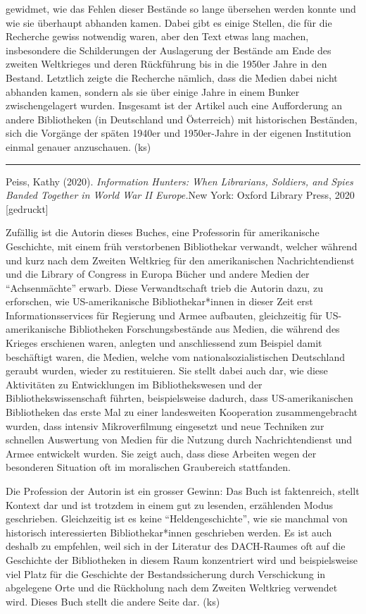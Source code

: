 \documentclass[a4paper,
fontsize=11pt,
oneside,
numbers=noperiodatend,
parskip=half-,
bibliography=totoc,
final
]{scrartcl}
\begin{document}
gewidmet, wie das Fehlen dieser Bestände so lange übersehen werden
konnte und wie sie überhaupt abhanden kamen. Dabei gibt es einige
Stellen, die für die Recherche gewiss notwendig waren, aber den Text
etwas lang machen, insbesondere die Schilderungen der Auslagerung der
Bestände am Ende des zweiten Weltkrieges und deren Rückführung bis in
die 1950er Jahre in den Bestand. Letztlich zeigte die Recherche nämlich,
dass die Medien dabei nicht abhanden kamen, sondern als sie über einige
Jahre in einem Bunker zwischengelagert wurden. Insgesamt ist der Artikel
auch eine Aufforderung an andere Bibliotheken (in Deutschland und
Österreich) mit historischen Beständen, sich die Vorgänge der späten
1940er und 1950er-Jahre in der eigenen Institution einmal genauer
anzuschauen. (ks)

\begin{center}\rule{0.5\linewidth}{0.5pt}\end{center}

Peiss, Kathy (2020). \emph{Information Hunters: When Librarians,
Soldiers, and Spies Banded Together in World War II Europe.}New York:
Oxford Library Press, 2020 {[}gedruckt{]}

Zufällig ist die Autorin dieses Buches, eine Professorin für
amerikanische Geschichte, mit einem früh verstorbenen Bibliothekar
verwandt, welcher während und kurz nach dem Zweiten Weltkrieg für den
amerikanischen Nachrichtendienst und die Library of Congress in Europa
Bücher und andere Medien der \enquote{Achsenmächte} erwarb. Diese
Verwandtschaft trieb die Autorin dazu, zu erforschen, wie
US-amerikanische Bibliothekar*innen in dieser Zeit erst
Informationsservices für Regierung und Armee aufbauten, gleichzeitig für
US-amerikanische Bibliotheken Forschungsbestände aus Medien, die während
des Krieges erschienen waren, anlegten und anschliessend zum Beispiel
damit beschäftigt waren, die Medien, welche vom nationalsozialistischen
Deutschland geraubt wurden, wieder zu restituieren. Sie stellt dabei
auch dar, wie diese Aktivitäten zu Entwicklungen im Bibliothekswesen und
der Bibliothekswissenschaft führten, beispielsweise dadurch, dass
US-amerikanischen Bibliotheken das erste Mal zu einer landesweiten
Kooperation zusammengebracht wurden, dass intensiv Mikroverfilmung
eingesetzt und neue Techniken zur schnellen Auswertung von Medien für
die Nutzung durch Nachrichtendienst und Armee entwickelt wurden. Sie
zeigt auch, dass diese Arbeiten wegen der besonderen Situation oft im
moralischen Graubereich stattfanden.

Die Profession der Autorin ist ein grosser Gewinn: Das Buch ist
faktenreich, stellt Kontext dar und ist trotzdem in einem gut zu
lesenden, erzählenden Modus geschrieben. Gleichzeitig ist es keine
\enquote{Heldengeschichte}, wie sie manchmal von historisch
interessierten Bibliothekar*innen geschrieben werden. Es ist auch
deshalb zu empfehlen, weil sich in der Literatur des DACH-Raumes oft auf
die Geschichte der Bibliotheken in diesem Raum konzentriert wird und
beispielsweise viel Platz für die Geschichte der Bestandssicherung durch
Verschickung in abgelegene Orte und die Rückholung nach dem Zweiten
Weltkrieg verwendet wird. Dieses Buch stellt die andere Seite dar. (ks)
\end{document}
